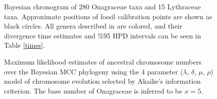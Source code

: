 \documentclass[review]{elsarticle}
\begin{document}
\begin{figure}[p]
    \vspace*{-2cm}
    \caption{
       Bayesian chronogram of 280 Onagraceae taxa and 15 Lythraceae taxa.
       Approximate positions of fossil calibration points are shown as black circles.
       All genera described in \citet{wagner2007revised} are colored, and their
       divergence time estimates and \%95 HPD intervals can be seen in Table \ref{times}.
}
    \label{genera}
\end{figure}


\begin{figure}[p]
    \vspace*{-2cm}
    \caption{
    Maximum likelihood estimates of ancestral chromosome numbers over the Bayesian MCC phylogeny
    using the 4 parameter ($\lambda$, $\delta$, $\mu$, $\rho$) model of chromosome evolution selected by Akaike's information criterion.
    The base number of Onagraceae is inferred to be $x=5$.
    }
    \label{chromtree}
\end{figure}
\end{document}
